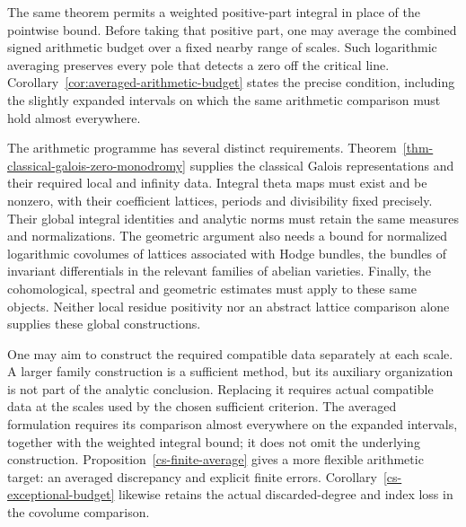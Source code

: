The same theorem permits a weighted positive-part integral in place of
the pointwise bound. Before taking that positive part, one may average
the combined signed arithmetic budget over a fixed nearby range of
scales. Such logarithmic averaging preserves every pole that detects a
zero off the critical line. Corollary~\ref{cor:averaged-arithmetic-budget}
states the precise condition, including the slightly expanded intervals
on which the same arithmetic comparison must hold almost everywhere.

The arithmetic programme has several distinct requirements.
Theorem~\ref{thm-classical-galois-zero-monodromy} supplies the classical
Galois representations and their required local and infinity data.
Integral theta maps must exist and be nonzero, with their
coefficient lattices, periods and divisibility fixed precisely.
Their global integral identities and analytic norms must retain the
same measures and normalizations. The geometric argument also needs
a bound for normalized logarithmic covolumes of lattices associated
with Hodge bundles, the bundles of invariant differentials in the
relevant families of abelian varieties. Finally, the cohomological,
spectral and geometric estimates must apply to these same objects.
Neither local residue positivity nor an abstract lattice comparison
alone supplies these global constructions.

One may aim to construct the required compatible data separately
at each scale. A larger family construction is a sufficient method,
but its auxiliary organization is not part of the analytic conclusion.
Replacing it requires actual compatible data at the scales used by the
chosen sufficient criterion. The averaged formulation requires its
comparison almost everywhere on the expanded intervals, together with
the weighted integral bound; it does not omit the underlying construction.
Proposition~\ref{cs-finite-average} gives a more flexible arithmetic
target: an averaged discrepancy and explicit finite errors.
Corollary~\ref{cs-exceptional-budget} likewise retains the actual
discarded-degree and index loss in the covolume comparison.

